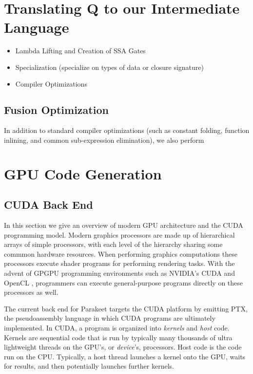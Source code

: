 \documentclass[preprint]{sigplanconf}
\begin{document}
\section{Translating Q to our Intermediate Language}
\label{Compilation}
\begin{itemize}
\item Lambda Lifting and Creation of SSA Gates 
\item Specialization (specialize on types of data or closure signature) 
\item Compiler Optimizations
\end{itemize} 

\subsection{Fusion Optimization}
In addition to standard compiler optimizations (such as constant folding, function inlining, and common sub-expression elimination), we also perform 

\section{GPU Code Generation}
\subsection{CUDA Back End}

In this section we give an overview of modern GPU architecture and the CUDA
programming model.  Modern graphics processors are made up of hierarchical
arrays of simple processors, with each level of the hierarchy sharing some
commmon hardware resources.  When performing graphics computations these
processors execute shader programs for performing rendering tasks.  With the
advent of GPGPU programming environments such as NVIDIA's CUDA \cite{NvidCU} and
OpenCL \cite{Muns10}, programmers can execute general-purpose programs directly
on these processors as well.

The current back end for Parakeet targets the CUDA platform by emitting PTX, the
pseudoassembly language in which CUDA programs are ultimately implemented.
In CUDA, a program is organized into {\it kernels} and {\it host} code.
Kernels are sequential code that is run by typically many thousands of ultra
lightweight threads on the GPU's, or {\it device}'s, processors.  Host code is
the code run on the CPU. Typically, a host thread launches a kernel onto the
GPU, waits for results, and then potentially launches further kernels.
\end{document}
